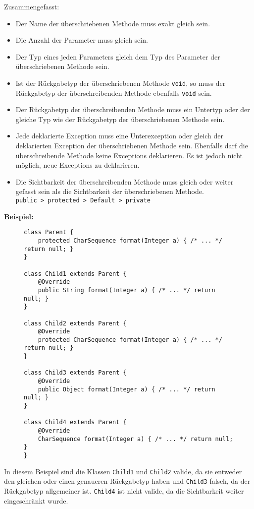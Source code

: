 		Zusammengefasst:
		\begin{itemize}
			\item Der Name der überschriebenen Methode muss exakt gleich sein.
			\item Die Anzahl der Parameter muss gleich sein.
			\item Der Typ eines jeden Parameters gleich dem Typ des Parameter der überschriebenen Methode sein.
			\item Ist der Rückgabetyp der überschriebenen Methode \lstinline|void|, so muss der Rückgabetyp der überschreibenden Methode ebenfalls \lstinline|void| sein.
			\item Der Rückgabetyp der überschreibenden Methode muss ein Untertyp oder der gleiche Typ wie der Rückgabetyp der überschriebenen Methode sein.
			\item Jede deklarierte Exception muss eine Unterexception oder gleich der deklarierten Exception der überschriebenen Methode sein. Ebenfalls darf die überschreibende Methode keine Exceptions deklarieren. Es ist jedoch nicht möglich, neue Exceptions zu deklarieren.
			\item Die Sichtbarkeit der überschreibenden Methode muss gleich oder weiter gefasst sein als die Sichtbarkeit der überschriebenen Methode. \\ \lstinline|public > protected > Default > private|
		\end{itemize}
	
		\textbf{Beispiel:}
		\begin{figure}[H]
			\centering
			\begin{lstlisting}
class Parent {
	protected CharSequence format(Integer a) { /* ... */ return null; }
}

class Child1 extends Parent {
	@Override
	public String format(Integer a) { /* ... */ return null; }
}

class Child2 extends Parent {
	@Override
	protected CharSequence format(Integer a) { /* ... */ return null; }
}

class Child3 extends Parent {
	@Override
	public Object format(Integer a) { /* ... */ return null; }
}

class Child4 extends Parent {
	@Override
	CharSequence format(Integer a) { /* ... */ return null; }
}
\end{lstlisting}
		\end{figure}
		In diesem Beispiel sind die Klassen \lstinline|Child1| und \lstinline|Child2| valide, da sie entweder den gleichen oder einen genaueren Rückgabetyp haben und \lstinline|Child3| falsch, da der Rückgabetyp allgemeiner ist. \lstinline|Child4| ist nicht valide, da die Sichtbarkeit weiter eingeschränkt wurde.
	
